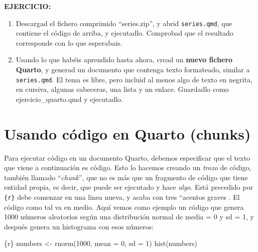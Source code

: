 \documentclass[
  letterpaper,
  DIV=11,
  numbers=noendperiod]{scrreprt}
\newenvironment{Shaded}{\begin{snugshade}}{\end{snugshade}}
\newcommand{\AttributeTok}[1]{\textcolor[rgb]{0.40,0.45,0.13}{#1}}
\newcommand{\DecValTok}[1]{\textcolor[rgb]{0.68,0.00,0.00}{#1}}
\newcommand{\FunctionTok}[1]{\textcolor[rgb]{0.28,0.35,0.67}{#1}}
\newcommand{\InformationTok}[1]{\textcolor[rgb]{0.37,0.37,0.37}{#1}}
\newcommand{\NormalTok}[1]{\textcolor[rgb]{0.00,0.23,0.31}{#1}}
\newcommand{\OtherTok}[1]{\textcolor[rgb]{0.00,0.23,0.31}{#1}}
\begin{document}
\leavevmode{}%
\textbf{EJERCICIO:}

\begin{enumerate}
\def\labelenumi{\arabic{enumi}.}
\item
  Descargad el fichero comprimido ``series.zip'', y abrid
  \texttt{series.qmd}, que contiene el código de arriba, y ejecutadlo.
  Comprobad que el resultado corresponde con lo que esperabais.
\item
  Usando lo que habéis aprendido hasta ahora, cread un \textbf{nuevo
  fichero Quarto}, y generad un documento que contenga texto formateado,
  similar a \texttt{series.qmd}. El tema es libre, pero incluid al menos
  algo de texto en negrita, en cursiva, algunas cabeceras, una lista y
  un enlace. Guardadlo como ejercicio\_quarto.qmd y ejecutadlo.
\end{enumerate}

\hypertarget{usando-cuxf3digo-en-quarto-chunks}{%
\section{Usando código en Quarto
(chunks)}\label{usando-cuxf3digo-en-quarto-chunks}}

Para ejecutar código en un documento Quarto, debemos especificar que el
texto que viene a continuación es código. Esto lo hacemos creando un
\emph{trozo} de código, también llamado ``\emph{chunk}'', que no es más
que un fragmento de código que tiene entidad propia, es decir, que puede
ser ejecutado y hace \emph{algo}. Está precedido por
\texttt{\textasciigrave{}\textasciigrave{}\textasciigrave{}\{r\}} debe
comenzar en una linea nueva, y acaba con tres ``acentos
graves\texttt{\textasciigrave{}\textasciigrave{}\textasciigrave{}} . El
código como tal va en medio. Aquí vemos como ejemplo un código que
genera 1000 números aleatorios según una distribución normal de media =
0 y sd = 1, y después genera un histograma con esos números:

\begin{Shaded}
\begin{Highlighting}[]
\InformationTok{\textasciigrave{}\textasciigrave{}\textasciigrave{}\{r\}}
\NormalTok{numbers }\OtherTok{\textless{}{-}} \FunctionTok{rnorm}\NormalTok{(}\DecValTok{1000}\NormalTok{, }\AttributeTok{mean =} \DecValTok{0}\NormalTok{, }\AttributeTok{sd =} \DecValTok{1}\NormalTok{)}
\FunctionTok{hist}\NormalTok{(numbers)}
\InformationTok{\textasciigrave{}\textasciigrave{}\textasciigrave{}}
\end{Highlighting}
\end{Shaded}
\end{document}
